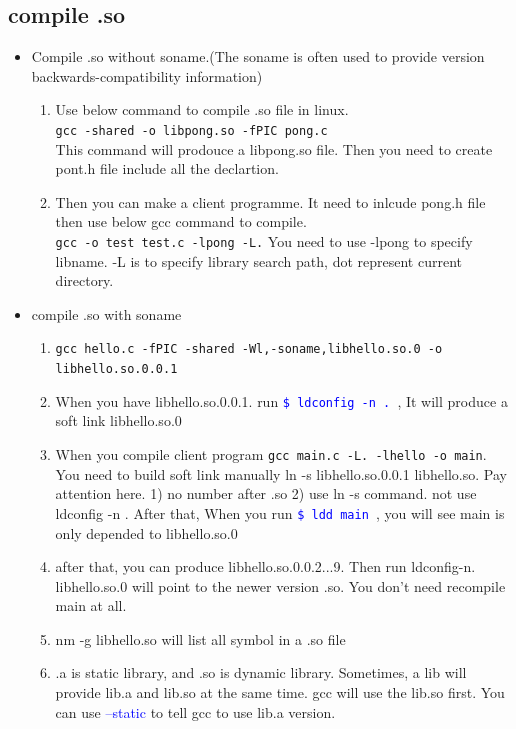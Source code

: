 \documentclass[a4paper,12pt,twoside]{book}
\newcommand{\linuxcommand}[1]{\texttt{\textcolor{blue}{\$ #1 \Pisymbol{psy}{191}}}}
\newcommand{\op}[1]{\textcolor{blue}{-#1}}
\begin{document}
\subsection{compile .so}
  \begin{itemize}

		  \item Compile .so without soname.(The soname is often used to provide version backwards-compatibility information)

	\begin{enumerate}
	\item Use below command to compile .so file in linux. \\
   \verb=gcc -shared -o libpong.so -fPIC pong.c= \\
   This command will prodouce a libpong.so file. Then you need to create pont.h file include all the declartion. 
   
   \item Then you can make a client programme. It need to inlcude pong.h file then use below gcc command to compile. \\
	\verb=gcc -o test test.c -lpong -L.=
	You need to use -lpong to specify libname. -L is to specify library search path, dot represent current directory.        
	\end{enumerate}

       \item compile .so with soname 
       \begin{enumerate}
		\item \verb=gcc hello.c -fPIC -shared -Wl,-soname,libhello.so.0 -o libhello.so.0.0.1= 
		
		\item When you have libhello.so.0.0.1. run \linuxcommand{ldconfig -n .}, It will produce a soft link libhello.so.0
		\item When you compile client program
		\verb=gcc main.c -L. -lhello -o main=. You need to build soft link manually 
		ln -s libhello.so.0.0.1 libhello.so. Pay attention here. 1) no number after .so 2) use ln -s command. not use ldconfig -n . After that, When you run \linuxcommand{ldd main}, you will see main is only depended to libhello.so.0
		
		\item after that, you can produce libhello.so.0.0.2...9. Then run ldconfig-n. libhello.so.0 will point to the newer version .so. You don't need recompile main at all.  

		\item nm -g libhello.so will list all symbol in a .so file
		
		  \item .a is static library, and .so is dynamic library. Sometimes, a lib will provide lib.a and lib.so at the same time. gcc will use the lib.so first. You can use \op{-static} to tell gcc to use lib.a version.
	\end{enumerate}
	
\end{itemize}
\end{document}
